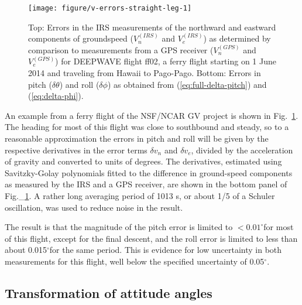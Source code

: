 \documentclass[english,british,amt,bookmarks=false,unicode=true]{copernicus}\usepackage[]{graphicx}\usepackage[]{color}
\makeatletter
\def\maxwidth{ %
  \ifdim\Gin@nat@width>\linewidth
    \linewidth
  \else
    \Gin@nat@width
  \fi
}
\newenvironment{knitrout}{}{} %
\makeatother
\begin{document}
\begin{knitrout}
\color{fgcolor}\begin{figure}
\texttt{[image: figure/v-errors-straight-leg-1]} \caption{Top: Errors in the IRS measurements of the northward and eastward components of groundspeed ($V_n^{(IRS)}$ and $V_e^{(IRS)}$) as determined by comparison to measurements from a GPS receiver ($V_n^{(GPS)}$ and $V_e^{(GPS)}$) for DEEPWAVE flight ff02, a ferry flight starting on 1 June 2014 and traveling from Hawaii to Pago-Pago. Bottom: Errors in pitch ($\delta\theta$) and roll ($\delta\phi$) as obtained from (\ref{eq:full-delta-pitch}) and (\ref{eq:delta-phi}).}\label{fig:v-errors-straight-leg}
\end{figure}


\end{knitrout}

An example from a ferry flight of the NSF/NCAR GV project is shown
in Fig.~\ref{fig:v-errors-straight-leg}. The heading for most of
this flight was close to southbound and steady, so to a reasonable
approximation the errors in pitch and roll will be given by the respective
derivatives in the error terms $\delta v_{n}$ and $\delta v_{e}$,
divided by the acceleration of gravity and converted to units of degrees.
The derivatives, estimated using Savitzky-Golay polynomials fitted
to the difference in ground-speed components as measured by the IRS
and a GPS receiver, are shown in the bottom panel of Fig.\_\ref{fig:v-errors-straight-leg}.
 A rather long averaging period of 1013 s, or about 1/5 of a Schuler
oscillation, was used to reduce noise in the result.

The result is that the magnitude of the pitch error is limited to
$<0.01^{\circ}$for most of this flight, except for the final descent,
and the roll error is limited to less than about 0.015$^{\circ}$for
the same period. This is evidence for low uncertainty in both measurements
for this flight, well below the specified uncertainty of 0.05$^{\circ}$. 


\subsection{Transformation of attitude angles}
\end{document}
